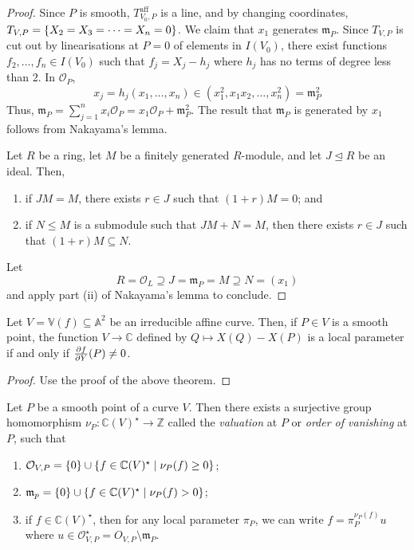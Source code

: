 \begin{proof}
    Since \( P \) is smooth, \( T_{V_0,P}^{\text{aff}} \) is a line, and by changing coordinates, \( T_{V,P} = \qty{X_2 = X_3 = \dots = X_n = 0} \).
    We claim that \( x_1 \) generates \( \mathfrak m_P \).
    Since \( T_{V,P} \) is cut out by linearisations at \( P = 0 \) of elements in \( I(V_0) \), there exist functions \( f_2, \dots, f_n \in I(V_0) \) such that \( f_j = X_j - h_j \) where \( h_j \) has no terms of degree less than 2.
    In \( \mathcal O_P \),
    \[ x_j = h_j(x_1, \dots, x_n) \in (x_1^2, x_1 x_2, \dots, x_n^2) = \mathfrak m_P^2 \]
    Thus, \( \mathfrak m_P = \sum_{j=1}^n x_i \mathcal O_P = x_1 \mathcal O_P + \mathfrak m_P^2 \).
    The result that \( \mathfrak m_P \) is generated by \( x_1 \) follows from Nakayama's lemma.
    \begin{lemma}[Nakayama]
        Let \( R \) be a ring, let \( M \) be a finitely generated \( R \)-module, and let \( J \trianglelefteq R \) be an ideal.
        Then,
        \begin{enumerate}
            \item if \( JM = M \), there exists \( r \in J \) such that \( (1+r)M = 0 \); and
            \item if \( N \leq M \) is a submodule such that \( JM + N = M \), then there exists \( r \in J \) such that \( (1+r)M \subseteq N \).
        \end{enumerate}
    \end{lemma}
    Let
    \[ R = \mathcal O_L \supseteq J = \mathfrak m_P = M \supseteq N = (x_1) \]
    and apply part (ii) of Nakayama's lemma to conclude.
\end{proof}
\begin{corollary}
    Let \( V = \mathbb V(f) \subseteq \mathbb A^2 \) be an irreducible affine curve.
    Then, if \( P \in V \) is a smooth point, the function \( V \to \mathbb C \) defined by \( Q \mapsto X(Q) - X(P) \) is a local parameter if and only if \( \pdv{f}{Y}\qty(P) \neq 0 \).
\end{corollary}
\begin{proof}
    Use the proof of the above theorem.
\end{proof}
\begin{corollary}
    Let \( P \) be a smooth point of a curve \( V \).
    Then there exists a surjective group homomorphism \( \nu_P \colon \mathbb C(V)^\star \to \mathbb Z \) called the \emph{valuation} at \( P \) or \emph{order of vanishing} at \( P \), such that
    \begin{enumerate}
        \item \( \mathcal O_{V,P}  = \qty{0} \cup \qty{f \in \mathbb C(V)^\star \mid \nu_P(f) \geq 0} \);
        \item \( \mathfrak m_p = \qty{0} \cup \qty{f \in \mathbb C(V)^\star \mid \nu_P(f) > 0} \);
        \item if \( f \in \mathbb C(V)^\star \), then for any local parameter \( \pi_P \), we can write \( f = \pi_P^{\nu_P(f)} u \) where \( u \in \mathcal O_{V,P}^\star = O_{V,P} \setminus \mathfrak m_P \).
    \end{enumerate}
\end{corollary}
